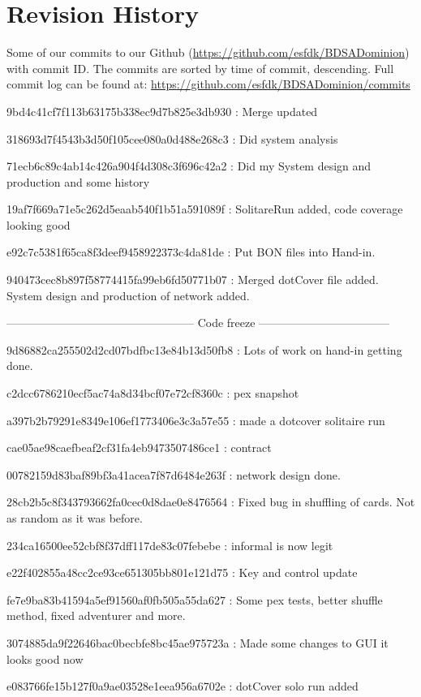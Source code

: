 \section{Revision History}
Some of our commits to our Github (\url{https://github.com/esfdk/BDSADominion})  with commit ID. The commits are sorted by time of commit, descending. Full commit log can be found at: \url{https://github.com/esfdk/BDSADominion/commits}



9bd4c41cf7f113b63175b338ec9d7b825e3db930 : Merge updated

318693d7f4543b3d50f105cee080a0d488e268c3 : Did system analysis

71ecb6c89c4ab14c426a904f4d308c3f696c42a2 : Did my System design and production and some history

19af7f669a71e5c262d5eaab540f1b51a591089f : SolitareRun added, code coverage looking good

e92c7c5381f65ca8f3deef9458922373c4da81de : Put BON files into Hand-in.

940473cec8b897f58774415fa99eb6fd50771b07 : Merged dotCover file added. System design and production of network added.

-------------------------------------------------- Code freeze -----------------------------------

9d86882ca255502d2cd07bdfbc13e84b13d50fb8 : Lots of work on hand-in getting done.

c2dcc6786210ecf5ac74a8d34bcf07e72cf8360c : pex snapshot

a397b2b79291e8349e106ef1773406e3c3a57e55 : made a dotcover solitaire run

cae05ae98caefbeaf2cf31fa4eb9473507486ce1 : contract

00782159d83baf89bf3a41acea7f87d6484e263f : network design done.

28cb2b5c8f343793662fa0cec0d8dae0e8476564 : Fixed bug in shuffling of cards. Not as random as it was before.

234ca16500ee52cbf8f37dff117de83c07febebe : informal is now legit

e22f402855a48cc2ce93ce651305bb801e121d75 : Key and control update

fe7e9ba83b41594a5ef91560af0fb505a55da627 : Some pex tests, better shuffle method, fixed adventurer and more.

3074885da9f22646bac0becbfe8bc45ae975723a : Made some changes to GUI it looks good now

e083766fe15b127f0a9ae03528e1eea956a6702e : dotCover solo run added

